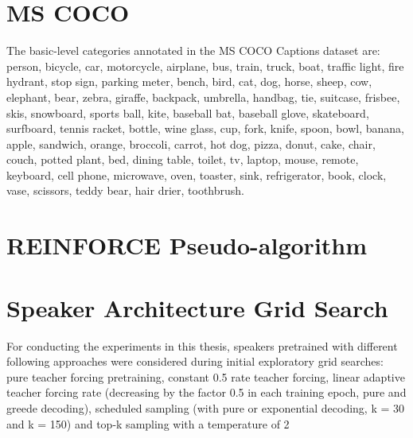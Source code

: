\section{MS COCO}

The basic-level categories annotated in the MS COCO Captions dataset are: person, bicycle, car, motorcycle, airplane, bus, train, truck, boat, traffic light, fire hydrant, stop sign, parking meter, bench, bird, cat, dog, horse, sheep, cow, elephant, bear, zebra, giraffe, backpack, umbrella, handbag, tie, suitcase, frisbee, skis, snowboard, sports ball, kite, baseball bat, baseball glove, skateboard, surfboard, tennis racket, bottle, wine glass, cup, fork, knife, spoon, bowl, banana, apple, sandwich, orange, broccoli, carrot, hot dog, pizza, donut, cake, chair, couch, potted plant, bed, dining table, toilet, tv, laptop, mouse, remote, keyboard, cell phone, microwave, oven, toaster, sink, refrigerator, book, clock, vase, scissors, teddy bear, hair drier, toothbrush.


\section{REINFORCE Pseudo-algorithm}

\section{Speaker Architecture Grid Search}
\label{app:grid_search}

For conducting the experiments in this thesis, speakers pretrained with different following approaches were considered during initial exploratory grid searches: pure teacher forcing pretraining, constant 0.5 rate teacher forcing, linear adaptive teacher forcing rate (decreasing by the factor 0.5 in each training epoch, pure and greede decoding), scheduled sampling (with pure or exponential decoding, k = 30 and k = 150) and top-k sampling with a temperature of 2